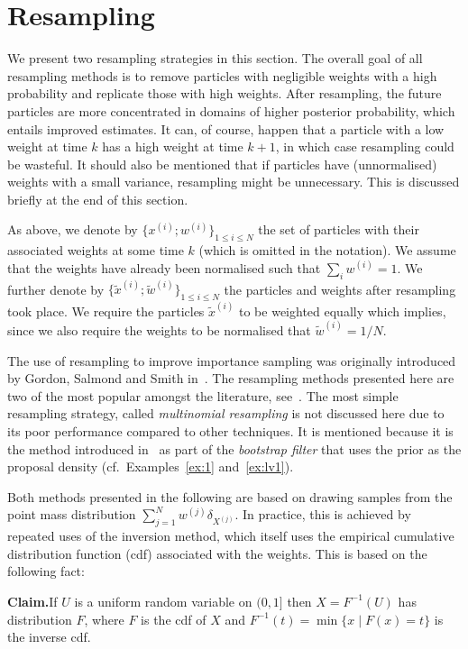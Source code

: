 \section*{Resampling}
We present two resampling strategies in this section. The overall goal
of all resampling methods is to remove particles with negligible
weights with a high probability and replicate those with high
weights. After resampling, the future particles are more concentrated
in domains of higher posterior probability, which entails improved
estimates. It can, of course, happen that a particle with a low weight
at time $k$ has a high weight at time $k+1$, in which case resampling
could be wasteful. It should also be mentioned that if particles have
(unnormalised) weights with a small variance, resampling might be
unnecessary. This is discussed briefly at the end of this section.

As above, we denote by $\{ x^{(i)}; w^{(i)} \}_{1 \le i \le N}$ the
set of particles with their associated weights at some time $k$ (which
is omitted in the notation). We assume that the weights have already
been normalised such that $\sum_i w^{(i)} = 1$. We further denote by
$\{ \tilde{x}^{(i)}; \tilde{w}^{(i)} \}_{1 \le i \le N}$ the particles
and weights after resampling took place. We require the particles
$\tilde{x}^{(i)}$ to be weighted equally which implies, since we also
require the weights to be normalised that $\tilde{w}^{(i)} = 1/N$.

The use of resampling to improve importance sampling was originally
introduced by Gordon, Salmond and Smith in~\cite{gordon}. The
resampling methods presented here are two of the most popular amongst
the literature, see~\cite{douc}. The most simple resampling strategy,
called \emph{multinomial resampling} is not discussed here due to its
poor performance compared to other techniques. It is mentioned because
it is the method introduced in~\cite{gordon} as part of the\emph{
  bootstrap filter} that uses the prior as the proposal density
(cf.\ Examples~\ref{ex:1} and~\ref{ex:lv1}).

Both methods presented in the following are based on drawing samples
from the point mass distribution
$\sum_{j=1}^N w^{(j)} \delta_{X^{(j)}}$. In practice, this is achieved
by repeated uses of the inversion method, which itself uses the
empirical cumulative distribution function (cdf) associated with the
weights. This is based on the following fact:

\textbf{Claim.}\quad If $U$ is a uniform random variable on $(0,1]$
then $X = F^{-1}(U)$ has distribution $F$, where $F$ is the cdf of $X$
and $F^{-1}(t) = \min \{ x \mid F(x) = t \}$ is the inverse cdf.

